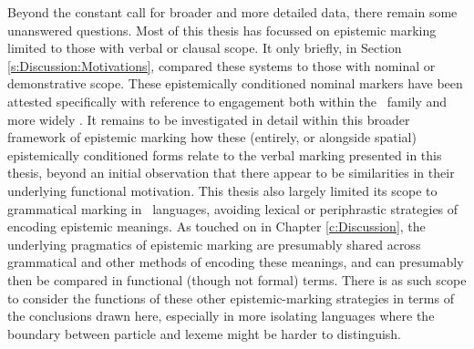 Beyond the constant call for broader and more detailed data, there remain some unanswered questions. Most of this thesis has focussed on epistemic marking limited to those with verbal or clausal scope. It only briefly, in Section \ref{s:Discussion:Motivations}, compared these systems to those with nominal or demonstrative scope. These epistemically conditioned nominal markers have been attested specifically with reference to engagement both within the \lfam\ family \cite{GonzalezPerez2022} and more widely \cites{EvansBergqvistSanRoque2018a}{EvansBergqvistSanRoque2018b}. It remains to be investigated in detail within this broader framework of epistemic marking how these (entirely, or alongside spatial) epistemically conditioned forms relate to the verbal marking presented in this thesis, beyond an initial observation that there appear to be similarities in their underlying functional motivation. This thesis also largely limited its scope to grammatical marking in \lfam\ languages, avoiding lexical or periphrastic strategies of encoding epistemic meanings. As touched on in Chapter \ref{c:Discussion}, the underlying pragmatics of epistemic marking are presumably shared across grammatical and other methods of encoding these meanings, and can presumably then be compared in functional (though not formal) terms. There is as such scope to consider the functions of these other epistemic-marking strategies in terms of the conclusions drawn here, especially in more isolating languages where the boundary between particle and lexeme might be harder to distinguish.
